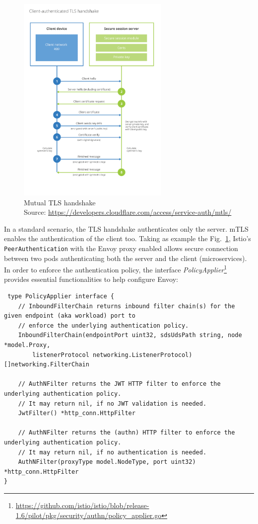 \begin{figure}
    \centering
    \includegraphics[width=0.65\textwidth]{chapters/images/chp2/mtls.png}
    \caption[Mutual TLS handshake]{Mutual TLS handshake\\Source: \url{https://developers.cloudflare.com/access/service-auth/mtls/}}
    \label{fig:mtls}
\end{figure}

In a standard scenario, the TLS handshake authenticates only the server. mTLS enables the authentication of the client too. Taking as example the Fig.~\ref{fig:mtls}, Istio's \texttt{PeerAuthentication} with the Envoy proxy enabled allows secure connection between two pods authenticating both the server and the client (microservices). In order to enforce the authentication policy, the interface \textit{PolicyApplier}\footnote{\url{https://github.com/istio/istio/blob/release-1.6/pilot/pkg/security/authn/policy\_applier.go}} provides essential functionalities to help configure Envoy:

\begin{lstlisting}
 type PolicyApplier interface {
    // InboundFilterChain returns inbound filter chain(s) for the given endpoint (aka workload) port to
    // enforce the underlying authentication policy.
    InboundFilterChain(endpointPort uint32, sdsUdsPath string, node *model.Proxy,
        listenerProtocol networking.ListenerProtocol) []networking.FilterChain

    // AuthNFilter returns the JWT HTTP filter to enforce the underlying authentication policy.
    // It may return nil, if no JWT validation is needed.
    JwtFilter() *http_conn.HttpFilter

    // AuthNFilter returns the (authn) HTTP filter to enforce the underlying authentication policy.
    // It may return nil, if no authentication is needed.
    AuthNFilter(proxyType model.NodeType, port uint32) *http_conn.HttpFilter
}
\end{lstlisting}


